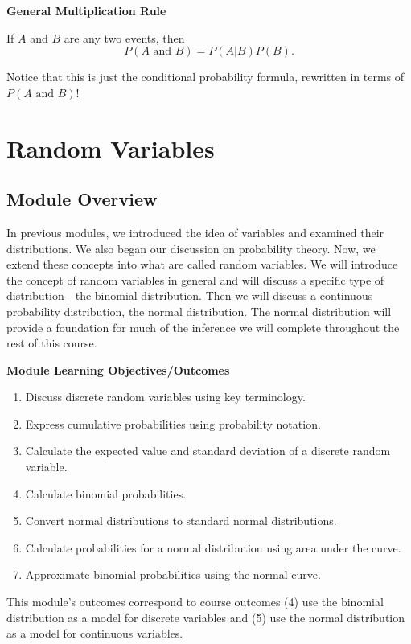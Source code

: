 \documentclass[
]{book}
\providecommand{\tightlist}{%
  \setlength{\itemsep}{0pt}\setlength{\parskip}{0pt}}
\begin{document}
\textbf{General Multiplication Rule}

If \(A\) and \(B\) are any two events, then \[P(A \text{ and }B) = P(A|B)P(B).\]

Notice that this is just the conditional probability formula, rewritten in terms of \(P(A \text{ and }B)\)!

\hypertarget{random-variables}{%
\chapter{Random Variables}\label{random-variables}}

\hypertarget{module-overview-3}{%
\section{Module Overview}\label{module-overview-3}}

In previous modules, we introduced the idea of variables and examined their distributions. We also began our discussion on probability theory. Now, we extend these concepts into what are called random variables. We will introduce the concept of random variables in general and will discuss a specific type of distribution - the binomial distribution. Then we will discuss a continuous probability distribution, the normal distribution. The normal distribution will provide a foundation for much of the inference we will complete throughout the rest of this course.

\textbf{Module Learning Objectives/Outcomes}

\begin{enumerate}
\def\labelenumi{\arabic{enumi}.}
\tightlist
\item
  Discuss discrete random variables using key terminology.
\item
  Express cumulative probabilities using probability notation.
\item
  Calculate the expected value and standard deviation of a discrete random variable.
\item
  Calculate binomial probabilities.
\item
  Convert normal distributions to standard normal distributions.
\item
  Calculate probabilities for a normal distribution using area under the curve.
\item
  Approximate binomial probabilities using the normal curve.
\end{enumerate}

This module's outcomes correspond to course outcomes (4) use the binomial distribution as a model for discrete variables and (5) use the normal distribution as a model for continuous variables.
\end{document}
